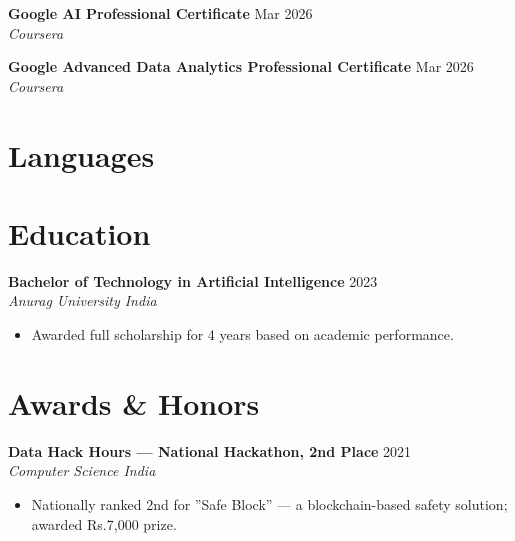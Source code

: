 \documentclass[10pt,letterpaper]{article}
\newcommand{\entry}[3]{%
  \vspace{3pt}\textbf{#1} \hfill #3 \\
  \textit{\small #2}\vspace{1pt}}
\begin{document}
\textbf{Google AI Professional Certificate} \hfill Mar 2026 \\
\textit{Coursera}

\textbf{Google Advanced Data Analytics Professional Certificate} \hfill Mar 2026 \\
\textit{Coursera}

\section{Languages}


\section{Education}

\entry{Bachelor of Technology in Artificial Intelligence}{Anurag University \textbullet{} India}{2023}
\begin{itemize}
  \item Awarded full scholarship for 4 years based on academic performance.
\end{itemize}

\section{Awards \& Honors}

\textbf{Data Hack Hours --- National Hackathon, 2nd Place} \hfill 2021 \\
\textit{Computer Science India}
\begin{itemize}
  \item Nationally ranked 2nd for ''Safe Block'' --- a blockchain-based safety solution; awarded Rs.7,000 prize.
\end{itemize}
\end{document}
